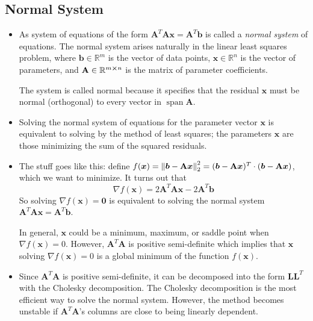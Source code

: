 \documentclass[11pt, a4paper]{article}
\newcommand{\R}{\mathbb{R}} %
\newcommand{\mat}[1]{\mathbf{#1}} %
\begin{document}
\subsection{Normal System}
\begin{itemize}
	\item As system of equations of the form $ \mat{A}^{T}\mat{A} \bm{x} = \mat{A}^{T}\bm{b} $ is called a \textit{normal system} of equations. The normal system arises naturally in the linear least squares problem, where $ \bm{b} \in \R^{m} $ is the vector of data points, $ \bm{x} \in \R^{n} $ is the vector of parameters, and $ \mat{A} \in \R^{m \cross n} $ is the matrix of parameter coefficients.
	
	The system is called normal because it specifies that the residual $ \bm{x} $ must be normal (orthogonal) to every vector in $ \operatorname{span} \mat{A} $.
	
	\item Solving the normal system of equations for the parameter vector $ \bm{x} $ is equivalent to solving by the method of least squares; the parameters $ \bm{x} $ are those minimizing the sum of the squared residuals.
	
	\item The stuff goes like this: define $ f(\bm{x}) = \norm{\bm{b} - \mat{A}\bm{x}}^{2}_{2} = (\bm{b} - \mat{A}\bm{x})^{T} \cdot  (\bm{b} - \mat{A}\bm{x}) $, which we want to minimize. It turns out that
	\begin{equation*}
		\nabla f(\bm{x}) = 2 \mat{A}^{T}\mat{A} \bm{x} - 2 \mat{A}^{T} \bm{b}
	\end{equation*}
	So solving $ \nabla f(\bm{x}) = \bm{0} $ is equivalent to solving the normal system $  \mat{A}^{T}\mat{A} \bm{x} = \mat{A}^{T} \bm{b} $.
	
	In general, $ \bm{x} $ could be a minimum, maximum, or saddle point when $ \nabla f(\bm{x}) = 0$. However, $ \mat{A}^{T}\mat{A} $ is positive semi-definite which implies that $ \bm{x} $ solving $ \nabla f(\bm{x}) = 0$ is a global minimum of the function $ f(\bm{x}) $.
	
	\item Since $ \mat{A}^{T}\mat{A} $ is positive semi-definite, it can be decomposed into the form $ \mat{L}\mat{L}^{T} $ with the Cholesky decomposition. The Cholesky decomposition is the most efficient way to solve the normal system. However, the method becomes unstable if $ \mat{A}^{T}\mat{A} $'s columns are close to being linearly dependent.
\end{itemize}
\end{document}
